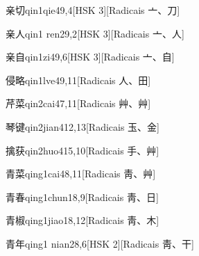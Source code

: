 \begin{entry}{亲切}{qin1qie4}{9,4}[HSK 3][Radicais ⼇、⼑]
\end{entry}

\begin{entry}{亲人}{qin1 ren2}{9,2}[HSK 3][Radicais ⼇、⼈]
\end{entry}

\begin{entry}{亲自}{qin1zi4}{9,6}[HSK 3][Radicais ⼇、⾃]
\end{entry}

\begin{entry}{侵略}{qin1lve4}{9,11}[Radicais ⼈、⽥]
\end{entry}

\begin{entry}{芹菜}{qin2cai4}{7,11}[Radicais ⾋、⾋]
\end{entry}

\begin{entry}{琴键}{qin2jian4}{12,13}[Radicais ⽟、⾦]
\end{entry}

\begin{entry}{擒获}{qin2huo4}{15,10}[Radicais ⼿、⾋]
\end{entry}

\begin{entry}{青菜}{qing1cai4}{8,11}[Radicais ⾭、⾋]
\end{entry}

\begin{entry}{青春}{qing1chun1}{8,9}[Radicais ⾭、⽇]
\end{entry}

\begin{entry}{青椒}{qing1jiao1}{8,12}[Radicais ⾭、⽊]
\end{entry}

\begin{entry}{青年}{qing1 nian2}{8,6}[HSK 2][Radicais ⾭、⼲]
\end{entry}


